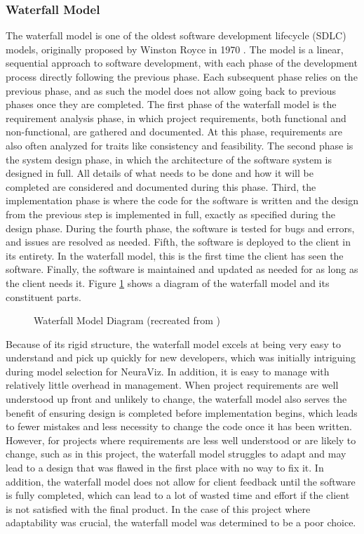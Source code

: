 \subsubsection{Waterfall Model}
The waterfall model is one of the oldest software development lifecycle (SDLC) models, originally proposed by Winston Royce in 1970 \cite{Gagan2020}. The model is a linear, sequential approach to software development, with each phase of the development process directly following the previous phase. Each subsequent phase relies on the previous phase, and as such the model does not allow going back to previous phases once they are completed. The first phase of the waterfall model is the requirement analysis phase, in which project requirements, both functional and non-functional, are gathered and documented. At this phase, requirements are also often analyzed for traits like consistency and feasibility. The second phase is the system design phase, in which the architecture of the software system is designed in full. All details of what needs to be done and how it will be completed are considered and documented during this phase. Third, the implementation phase is where the code for the software is written and the design from the previous step is implemented in full, exactly as specified during the design phase. During the fourth phase, the software is tested for bugs and errors, and issues are resolved as needed. Fifth, the software is deployed to the client in its entirety. In the waterfall model, this is the first time the client has seen the software. Finally, the software is maintained and updated as needed for as long as the client needs it. Figure \ref{fig:waterfall_model} shows a diagram of the waterfall model and its constituent parts.

\begin{figure}[htb]
    \centering
    
    \caption[Waterfall Model Diagram]{Waterfall Model Diagram (recreated from \cite{tutorialspointWaterfall})}
    \label{fig:waterfall_model}
\end{figure}

Because of its rigid structure, the waterfall model excels at being very easy to understand and pick up quickly for new developers, which was initially intriguing during model selection for NeuraViz. In addition, it is easy to manage with relatively little overhead in management. When project requirements are well understood up front and unlikely to change, the waterfall model also serves the benefit of ensuring design is completed before implementation begins, which leads to fewer mistakes and less necessity to change the code once it has been written. However, for projects where requirements are less well understood or are likely to change, such as in this project, the waterfall model struggles to adapt and may lead to a design that was flawed in the first place with no way to fix it. In addition, the waterfall model does not allow for client feedback until the software is fully completed, which can lead to a lot of wasted time and effort if the client is not satisfied with the final product. In the case of this project where adaptability was crucial, the waterfall model was determined to be a poor choice.

